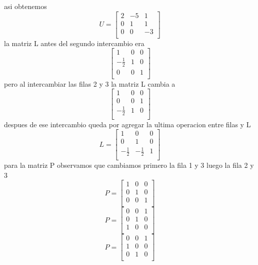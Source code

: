 \documentclass{article}
\begin{document}
asi obtenemos
\[
    U=
    \begin{bmatrix}
        2 & -5  & 1   \\
        0 & 1  & 1   \\
        0 & 0 & -3   \\
    \end{bmatrix}
\]
la matriz L antes del segundo intercambio era
\[
    \begin{bmatrix}
        1 & 0  & 0   \\
        -\frac{1}{2} & 1  & 0   \\
        0 & 0 & 1  \\
    \end{bmatrix}
\]
pero al intercambiar las filas 2 y 3 la matriz L cambia a 
\[
    \begin{bmatrix}
        1 & 0  & 0   \\
        0 & 0 & 1  \\
        -\frac{1}{2} & 1  & 0   \\
    \end{bmatrix}
\]
despues de ese intercambio queda por agregar la ultima operacion entre filas y L
\[
  L =
\begin{bmatrix}
        1 & 0  & 0   \\
        0 & 1 & 0  \\
        -\frac{1}{2} & -\frac{1}{2}  & 1   \\
    \end{bmatrix}
\]
para la matriz P observamos que cambiamos primero la fila 1 y 3
luego la fila 2 y 3
\[
  P =
\begin{bmatrix}
        1 & 0  & 0   \\
        0 & 1 & 0  \\
        0 & 0  & 1   \\
    \end{bmatrix}
\]
\[
  P =
\begin{bmatrix}
    0 & 0  & 1   \\
    0 & 1 & 0  \\
        1 & 0  & 0   \\
    \end{bmatrix}
\]
\[
  P =
\begin{bmatrix}
    0 & 0  & 1   \\
    1 & 0  & 0   \\
    0 & 1 & 0  \\
    \end{bmatrix}
\]
\end{document}
